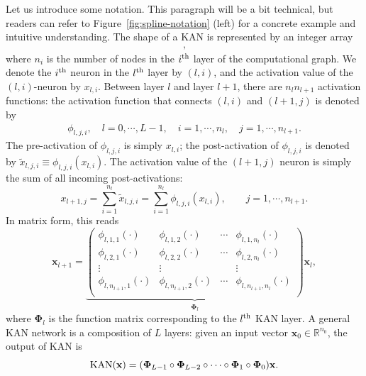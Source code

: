 \documentclass{article}
\numberwithin{equation}{section}
\numberwithin{figure}{section}
\newcommand{\mat}[1]{\mathbf{#1}}
\begin{document}
Let us introduce some notation. This paragraph will be a bit technical, but readers can refer to Figure~\ref{fig:spline-notation} (left) for a concrete example and intuitive understanding. The shape of a KAN is represented by an integer array 
\begin{align}
    [n_0,n_1,\cdots,n_L],
\end{align}
where $n_i$ is the number of nodes in the $i^{\rm th}$ layer of the computational graph. We denote the $i^{\rm th}$ neuron in the $l^{\rm th}$ layer by $(l,i)$, and the activation value of the $(l,i)$-neuron by $x_{l,i}$. Between layer $l$ and layer $l+1$, there are $n_ln_{l+1}$ activation functions: the activation function that connects $(l,i)$ and $(l+1,j)$ is denoted by 
\begin{align}
    \phi_{l,j,i},\quad l=0,\cdots, L-1,\quad i=1,\cdots,n_{l},\quad j=1,\cdots,n_{l+1}.
\end{align}
The pre-activation of $\phi_{l,j,i}$ is simply $x_{l,i}$; the post-activation of $\phi_{l,j,i}$ is denoted by $\tilde{x}_{l,j,i}\equiv \phi_{l,j,i}(x_{l,i})$. The activation value of the $(l+1,j)$ neuron is simply the sum of all incoming post-activations: 
\begin{equation}\label{eq:kanforward}
    x_{l+1,j} =  \sum_{i=1}^{n_l} \tilde{x}_{l,j,i} = \sum_{i=1}^{n_l}\phi_{l,j,i}(x_{l,i}), \qquad j=1,\cdots,n_{l+1}.
\end{equation}
In matrix form, this reads
\begin{equation}\label{eq:kanforwardmatrix}
    \mat{x}_{l+1} = 
    \underbrace{\begin{pmatrix}
        \phi_{l,1,1}(\cdot) & \phi_{l,1,2}(\cdot) & \cdots & \phi_{l,1,n_{l}}(\cdot) \\
        \phi_{l,2,1}(\cdot) & \phi_{l,2,2}(\cdot) & \cdots & \phi_{l,2,n_{l}}(\cdot) \\
        \vdots & \vdots & & \vdots \\
        \phi_{l,n_{l+1},1}(\cdot) & \phi_{l,n_{l+1},2}(\cdot) & \cdots & \phi_{l,n_{l+1},n_{l}}(\cdot) \\
    \end{pmatrix}}_{\mat{\Phi}_l}
    \mat{x}_{l},
\end{equation}
where ${\mathbf \Phi}_l$ is the function matrix corresponding to the $l^{\rm th}$ KAN layer. A general KAN network is a composition of $L$ layers: given an input vector  $\mat{x}_0\in\mathbb{R}^{n_0}$, the output of KAN is
\begin{equation}\label{eq:KAN_forward}
    {\rm KAN}(\mat{x}) = (\mat{\Phi}_{L-1}\circ \mat{\Phi}_{L-2}\circ\cdots\circ\mat{\Phi}_{1}\circ\mat{\Phi}_{0})\mat{x}.
\end{equation}
\end{document}
